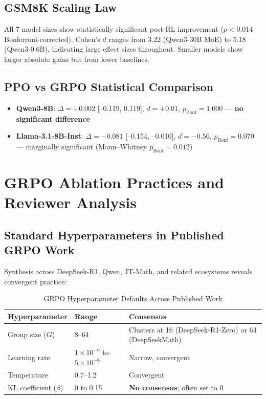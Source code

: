 \documentclass[12pt,a4paper]{report}
\theoremstyle{definition}
\begin{document}
\section{GSM8K Scaling Law}
\label{sec:gsm8k-scaling}

All 7 model sizes show statistically significant post-RL improvement ($p < 0.014$ Bonferroni-corrected).
Cohen's $d$ ranges from 3.22 (Qwen3-30B MoE) to 5.18 (Qwen3-0.6B), indicating large effect sizes throughout.
Smaller models show larger absolute gains but from lower baselines.

\section{PPO vs GRPO Statistical Comparison}
\label{sec:ppo-grpo-stats}

\begin{itemize}[nosep]
\item \textbf{Qwen3-8B}: $\Delta = +0.002$ [--0.119, 0.119], $d = +0.01$, $p_{\text{Bonf}} = 1.000$ --- \textbf{no significant difference}
\item \textbf{Llama-3.1-8B-Inst}: $\Delta = -0.081$ [--0.154, --0.010], $d = -0.56$, $p_{\text{Bonf}} = 0.070$ --- marginally significant (Mann--Whitney $p_{\text{Bonf}} = 0.012$)
\end{itemize}




\chapter{GRPO Ablation Practices and Reviewer Analysis}
\label{ch:ablation}

\section{Standard Hyperparameters in Published GRPO Work}
\label{sec:ablation-hparams}

Synthesis across DeepSeek-R1, Qwen, JT-Math, and related ecosystems reveals convergent practice:

\begin{table}[htbp]
\centering
\caption{GRPO Hyperparameter Defaults Across Published Work}
\label{tab:grpo-defaults}
\begin{tabular}{lll}
\toprule
\textbf{Hyperparameter} & \textbf{Range} & \textbf{Consensus} \\
\midrule
Group size ($G$) & 8--64 & Clusters at 16 (DeepSeek-R1-Zero) or 64 (DeepSeekMath) \\
Learning rate & $1 \times 10^{-6}$ to $5 \times 10^{-6}$ & Narrow, convergent \\
Temperature & 0.7--1.2 & Convergent \\
KL coefficient ($\beta$) & 0 to 0.15 & \textbf{No consensus}; often set to 0 \\
\bottomrule
\end{tabular}
\end{table}
\end{document}
